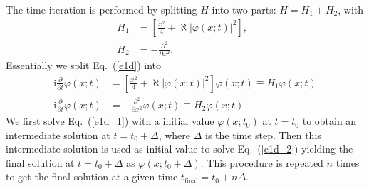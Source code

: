 \documentclass[onecolumn]{elsart3p}
\begin{document}
The time iteration is performed by splitting $H$ into two parts:
$H=H_1+H_2$, with
\begin{align}\label{h1}
H_1 & = \left[ \frac{x^2}{4}+\aleph  %
\left|
{\varphi(x;t)}
\right| ^2 \right], \;\; \\ \label{h2}
H_2 & = -\frac {\partial ^2}{\partial x^2}.
\end{align}
{
Essentially we split Eq.~(\ref{e1d}) into
\begin{align}
\mbox{i}\frac{\partial }{\partial t} \varphi (x;t) & =
\left[ \frac{x^2}{4}+\aleph  %
\left\vert {\varphi(x;t)}
\right\vert ^2\right] \varphi (x;t)  \equiv H_1  \varphi (x;t)
\label{e1d_1} \\
\mbox{i}\frac{\partial }{\partial t} \varphi (x;t) & =
-\frac{\partial^2}
{\partial x^2}\varphi (x;t)   \equiv H_2  \varphi (x;t)
\label{e1d_2} 
\end{align}
We first solve Eq.~(\ref{e1d_1}) with a initial value $\varphi (x;t_0)$ 
at $t = t_0$ to obtain an intermediate solution at $t = t_0 + \Delta$, where
$\Delta$ is the time step. 
Then this intermediate solution is used as initial value to solve 
Eq.~(\ref{e1d_2}) yielding the final solution at $t = t_0 + \Delta$ as 
$\varphi (x;t_0 + \Delta)$. This procedure is repeated $n$ times to get 
the final
solution at a given time $t_{\text{final}}=t_0+n\Delta $}. 
\end{document}

